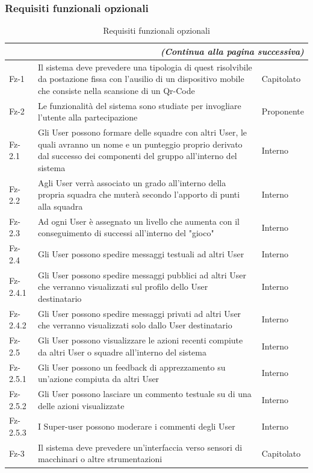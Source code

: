 \documentclass[10pt,a4paper]{article}
\begin{document}
\subsubsection{Requisiti funzionali opzionali}
\begin{longtable}{|p{}|p{}|p{}|}
\caption{Requisiti funzionali opzionali}\\
\hline
\endfirsthead
\multicolumn{3}{r}{\textit{(Continua alla pagina successiva)}}
\endfoot
\multicolumn{3}{l}{\textit{(Continua dalla pagina precedente)}}
\endhead
\hline
\endlastfoot
\textbf{Codice}& \textbf{Descrizione}& \textbf{Fonte}\\
\hline
Fz-1 & Il sistema deve prevedere una tipologia di quest risolvibile da postazione fissa con l'ausilio di un dispositivo mobile che consiste nella scansione di un Qr-Code & Capitolato\\
\hline
Fz-2 & Le funzionalità del sistema sono studiate per invogliare l'utente alla partecipazione & Proponente\\
\hline
Fz-2.1 & Gli User possono formare delle squadre con altri User, le quali avranno un nome e un punteggio proprio derivato dal successo dei componenti del gruppo all'interno del sistema & Interno\\
\hline
Fz-2.2 & Agli User verrà associato un grado all'interno della propria squadra che muterà secondo l'apporto di punti alla squadra & Interno\\
\hline
Fz-2.3 & Ad ogni User è assegnato un livello che aumenta con il conseguimento di successi all'interno del "gioco" & Interno\\
\hline
Fz-2.4 & Gli User possono spedire messaggi testuali ad altri User & Interno\\
\hline
Fz-2.4.1 & Gli User possono spedire messaggi pubblici ad altri User che verranno visualizzati sul profilo dello User destinatario & Interno\\
\hline
Fz-2.4.2 & Gli User possono spedire messaggi privati ad altri User che verranno visualizzati solo dallo User destinatario & Interno\\
\hline
Fz-2.5 & Gli User possono visualizzare le azioni recenti compiute da altri User o squadre all'interno del sistema & Interno\\
\hline
Fz-2.5.1 & Gli User possono un feedback di apprezzamento su un'azione compiuta da altri User & Interno\\
\hline
Fz-2.5.2 & Gli User possono lasciare un commento testuale su di una delle azioni visualizzate & Interno\\
\hline
Fz-2.5.3 & I Super-user possono moderare i commenti degli User & Interno\\
\hline
Fz-3 & Il sistema deve prevedere un'interfaccia verso sensori di macchinari o altre strumentazioni & Capitolato\\

\end{longtable}
\end{document}
